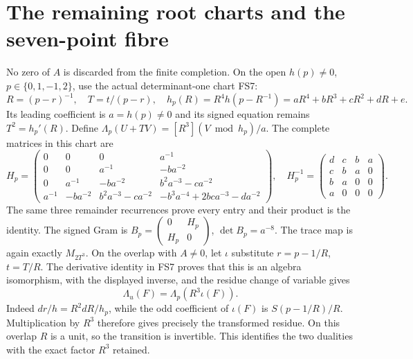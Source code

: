 \documentclass[11pt]{article}
\begin{document}
\section{The remaining root charts and the seven-point fibre}
No zero of $A$ is discarded from the finite completion.
On the open $h(p)\ne0$, $p\in\{0,1,-1,2\}$, use the
actual determinant-one chart FS7:
\begin{equation}
 R=(p-r)^{-1},\quad T=t/(p-r),\quad
 h_p(R)=R^4h(p-R^{-1})=aR^4+bR^3+cR^2+dR+e .
 \tag{RD24}
\end{equation}
Its leading coefficient is $a=h(p)\ne0$ and its signed
equation remains $T^2=h_p'(R)$. Define
$\Lambda_p(U+TV)=[R^3](V\bmod h_p)/a$.
The complete matrices in this chart are
\begin{equation}
 H_p=\begin{pmatrix}
 0&0&0&a^{-1}\\0&0&a^{-1}&-ba^{-2}\\
 0&a^{-1}&-ba^{-2}&b^2a^{-3}-ca^{-2}\\
 a^{-1}&-ba^{-2}&b^2a^{-3}-ca^{-2}&-b^3a^{-4}+2bca^{-3}-da^{-2}
 \end{pmatrix},\quad
 H_p^{-1}=\begin{pmatrix}d&c&b&a\\c&b&a&0\\b&a&0&0\\a&0&0&0\end{pmatrix}.
 \tag{RD25}
\end{equation}
The same three remainder recurrences prove every entry and
their product is the identity. The signed Gram is
$B_p=\left(\begin{smallmatrix}0&H_p\\H_p&0\end{smallmatrix}\right)$,
$\det B_p=a^{-8}$. The trace map is again exactly $M_{2T^3}$.
On the overlap with $A\ne0$, let $\iota$ substitute
$r=p-1/R$, $t=T/R$. The derivative identity in FS7 proves
that this is an algebra isomorphism, with the displayed
inverse, and the residue change of variable gives
\begin{equation}
 \Lambda_u(F)=\Lambda_p(R^3\iota(F)).
 \tag{RD26}
\end{equation}
Indeed $dr/h=R^2dR/h_p$, while the odd coefficient of
$\iota(F)$ is $S(p-1/R)/R$. Multiplication by $R^3$
therefore gives precisely the transformed residue. On this
overlap $R$ is a unit, so the transition is invertible.
This identifies the two dualities with the exact factor
$R^3$ retained.
\end{document}
